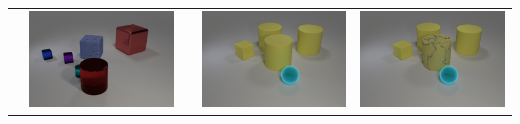 \begin{table}
\begin{tabular}{@{}ccccc@{}}
\begin{minipage}{.2\textwidth}
    \end{minipage}
    &
    \begin{minipage}{.2\textwidth}
      \includegraphics[width=\linewidth]{figures/clevr_datasets/CLEVRA_examples/train_material2.png}
    \end{minipage}
    &&
    \begin{minipage}{.2\textwidth}
      \includegraphics[width=\linewidth]{figures/clevr_datasets/CLEVRA_examples/test2.png}
    \end{minipage}
    &
        \begin{minipage}{.2\textwidth}
      \includegraphics[width=\linewidth]{figures/clevr_datasets/CLEVRA_examples/test_material2.png}

\end{minipage}
\end{tabular}
\end{table}
